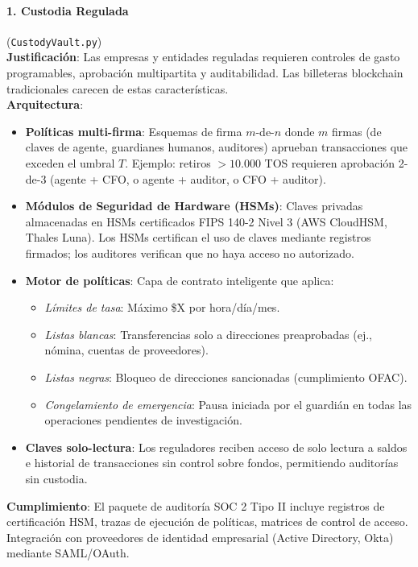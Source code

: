 \documentclass[11pt]{article}
\begin{document}
\paragraph{1. Custodia Regulada} (\texttt{CustodyVault.py})\\
\textbf{Justificación}: Las empresas y entidades reguladas requieren controles de gasto programables, aprobación multipartita y auditabilidad. Las billeteras blockchain tradicionales carecen de estas características.\\
\textbf{Arquitectura}:
\begin{itemize}[noitemsep]
  \item \textbf{Políticas multi-firma}: Esquemas de firma $m$-de-$n$ donde $m$ firmas (de claves de agente, guardianes humanos, auditores) aprueban transacciones que exceden el umbral $T$. Ejemplo: retiros $>10.000$ TOS requieren aprobación 2-de-3 (agente + CFO, o agente + auditor, o CFO + auditor).
  \item \textbf{Módulos de Seguridad de Hardware (HSMs)}: Claves privadas almacenadas en HSMs certificados FIPS 140-2 Nivel 3 (AWS CloudHSM, Thales Luna). Los HSMs certifican el uso de claves mediante registros firmados; los auditores verifican que no haya acceso no autorizado.
  \item \textbf{Motor de políticas}: Capa de contrato inteligente que aplica:
    \begin{itemize}[noitemsep]
      \item \emph{Límites de tasa}: Máximo \$X por hora/día/mes.
      \item \emph{Listas blancas}: Transferencias solo a direcciones preaprobadas (ej., nómina, cuentas de proveedores).
      \item \emph{Listas negras}: Bloqueo de direcciones sancionadas (cumplimiento OFAC).
      \item \emph{Congelamiento de emergencia}: Pausa iniciada por el guardián en todas las operaciones pendientes de investigación.
    \end{itemize}
  \item \textbf{Claves solo-lectura}: Los reguladores reciben acceso de solo lectura a saldos e historial de transacciones sin control sobre fondos, permitiendo auditorías sin custodia.
\end{itemize}
\textbf{Cumplimiento}: El paquete de auditoría SOC 2 Tipo II incluye registros de certificación HSM, trazas de ejecución de políticas, matrices de control de acceso. Integración con proveedores de identidad empresarial (Active Directory, Okta) mediante SAML/OAuth.
\end{document}
